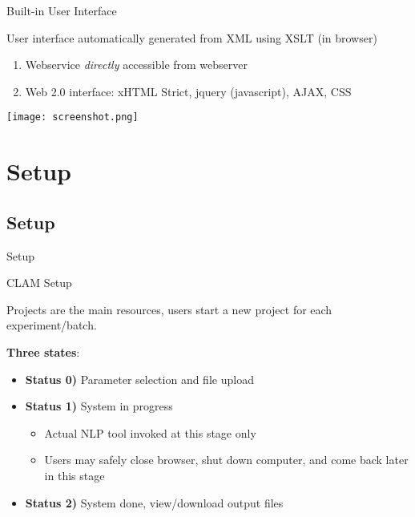 \documentclass[compress]{beamer}
\begin{document}
\begin{frame}
    \begin{block}{Built-in User Interface}

            User interface automatically generated from XML using XSLT (in browser)

            \begin{enumerate}
                \item Webservice \emph{directly} accessible from webserver
                \item Web 2.0 interface: xHTML Strict, jquery (javascript), AJAX, CSS
            \end{enumerate}
            

    \end{block}
    
    \begin{center}
    \texttt{[image: screenshot.png]}
    \end{center}

\end{frame}



\section{Setup}

\subsection{Setup}

\begin{frame}{Setup}
    \begin{block}{CLAM Setup}

            Projects are the main resources, users start a new project for each experiment/batch.
    
            \textbf{Three states}:

            \begin{itemize}
                \item \textbf{Status 0)} Parameter selection and file upload
                \item \textbf{Status 1)} System in progress
                \begin{itemize}
                    \item Actual NLP tool invoked at this stage only
                    \item Users may safely close browser, shut down computer, and come back later in this stage
                \end{itemize}
                \item \textbf{Status 2)} System done, view/download output files
            \end{itemize}


    \end{block}
\end{frame}
\end{document}
